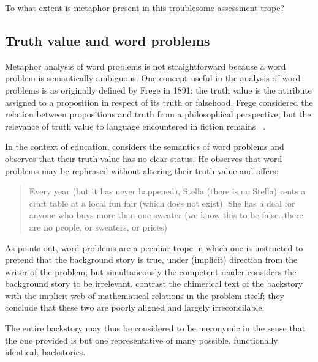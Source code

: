 To what extent is metaphor present in this troublesome assessment
trope?

\subsection{Truth value and word problems}


Metaphor analysis of word problems is not straightforward because a
word problem is semantically ambiguous.  One concept useful in the
analysis of word problems is  as originally
defined by Frege in 1891: the truth value is the attribute assigned to
a proposition in respect of its truth or falsehood.  Frege considered
the relation between propositions and truth from a philosophical
perspective; but the relevance of truth value to language encountered
in fiction remains ~\citep{lamarque1994}.

In the context of education,  considers the
semantics of word problems and observes that their truth value has no
clear status.  He observes that word problems may be rephrased without
altering their truth value and offers:

\begin{singlespace}
\begin{quote}
Every year (but it has never happened), Stella (there is no Stella)
rents a craft table at a local fun fair (which does not exist). She
has a deal for anyone who buys more than one sweater (we know this to
be false\ldots there are no people, or sweaters, or prices)
\end{quote}
\end{singlespace}

\noindent As  points out, word problems are a
peculiar trope in which one is instructed to pretend that the
background story is true, under (implicit) direction from the writer
of the problem; but simultaneously the competent reader considers the
background story to be irrelevant.   contrast the
chimerical text of the backstory with the implicit web of mathematical
relations in the problem itself; they conclude that these two
 are poorly aligned and largely
irreconcilable.

The entire backstory may thus be considered to be meronymic in the
sense that the one provided is but one representative of many
possible, functionally identical, backstories.



